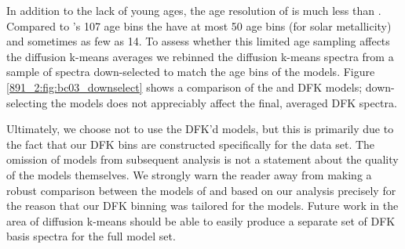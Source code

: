 
In addition to the lack of young ages, the age resolution of
 is much less than
. Compared to 's 107 age
bins the  have at most 50 age bins (for solar
metallicity) and sometimes as few as 14. To assess whether this limited
age sampling affects the diffusion k-means averages we rebinned the
 diffusion k-means spectra from a sample of
 spectra down-selected to match the age bins of
the  models. Figure \ref{891_2:fig:bc03_downselect}
shows a comparison of the  and
 DFK models; down-selecting the
 models does not appreciably affect the final,
averaged DFK spectra.

Ultimately, we choose not to use the DFK'd 
models, but this is primarily due to the fact that our DFK bins are
constructed specifically for the  data set. The
omission of  models from subsequent analysis is
not a statement about the quality of the models themselves. We
strongly warn the reader away from making a robust comparison between
the models of  and  based
on our analysis precisely for the reason that our DFK binning was
tailored for the  models.  Future work in the
area of diffusion k-means should be able to easily produce a separate
set of DFK basis spectra for the full  model
set.


